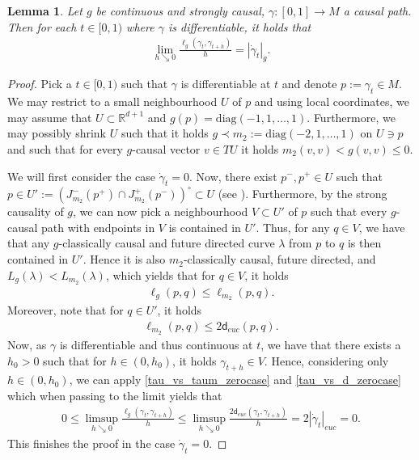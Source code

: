 \documentclass[a4paper,10pt]{article}
\newtheorem{lemma}[theorem]{Lemma}
\numberwithin{equation}{section}
\newcommand{\R}{\mathbb{R}}
\newcommand{\diag}{\mathrm{diag}}
\newcommand{\sfd}{\mathsf d}
\begin{document}
\begin{lemma}\label{causal_derivative_of_causal_curves}
     Let $g$ be continuous and strongly causal, $\gamma\colon[0,1] \to  M$ a causal path. Then for each $t \in [0,1)$ where $\gamma$ is differentiable, it holds that 
     \begin{align*}
         \lim_{h \searrow 0} \frac{\ell_g(\gamma_t, \gamma_{t+h})}{h} =|\dot{\gamma}_t|_g.
     \end{align*}
\end{lemma}
\begin{proof}
    Pick a $t \in [0, 1)$ such that $\gamma$ is differentiable at $t$ and denote $p:= \gamma_t \in M$.
    We may restrict to a small neighbourhood $U$ of $p$ and using local coordinates, we may assume that $U \subset \R^{d+1}$ and $g(p) = \mathrm{diag}(-1, 1, \ldots, 1)$. Furthermore, we may possibly shrink $U$ such that it holds \mbox{$g \prec m_2 := \diag(-2,1, \ldots, 1)$} on $U \ni p$ and such that for every $g$-causal vector $v \in TU$ it holds $m_2(v,v) < g(v,v) \leq 0$. 

    We will first consider the case $\dot{\gamma}_t=0$.
    Now, there exist $p^-, p^+\in U$ such that $p \in U':=  (J_{m_2}^-(p^+) \cap J_{m_2}^+(p^-))^\circ \subset U$ (see \cite[Theorem 2.14]{minguzzi2008causal}). Furthermore, by the strong causality of $g$, we can now pick a neighbourhood $V \subset U'$ of $p$ such that every $g$-causal path with endpoints in $V$ is contained in $U'$.  
    Thus, for any $q \in V$, we have that any $g$-classically causal and future directed curve $\lambda$ from $p$ to $q$ is then contained in $U'$. 
    Hence it is also $m_2$-classically causal, future directed, and $L_g(\lambda) < L_{m_2}(\lambda)$, which yields that for $q \in V$, it holds
    \begin{align}\label{tau_vs_taum_zerocase}
        \ell_g(p, q) \leq \ell_{m_2}(p, q).
    \end{align}
    Moreover, note that for $q \in U'$, it holds
    \begin{align}\label{tau_vs_d_zerocase}
        \ell_{m_2}(p, q) \leq 2  \sfd_{euc}(p, q).
    \end{align}
    Now, as $\gamma$ is differentiable and thus continuous at $t$, we have that there exists a $h_0 > 0$ such that for $h \in (0, h_0)$, it holds $\gamma_{t+h} \in V$.
    Hence, considering only $h \in (0, h_0)$, we can apply \eqref{tau_vs_taum_zerocase} and \eqref{tau_vs_d_zerocase} which when passing to the limit yields that
    \begin{align}
        0 \leq \limsup_{h \searrow 0}\frac{\ell_g(\gamma_t, \gamma_{t+h})}{h} \leq \limsup_{h \searrow 0} \frac{2\sfd_{euc}(\gamma_t, \gamma_{t+h})}{h} = 2|\dot{\gamma}_t|_{euc} = 0. 
    \end{align}
    This finishes the proof in the case $\dot{\gamma}_t=0$. 


\end{proof}
\end{document}
